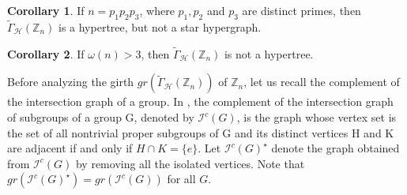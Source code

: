 \documentclass[11pt,a4paper]{article}
\theoremstyle{definition}
\newtheorem{corollary}{Corollary}[theorem]
\theoremstyle{remark}
\begin{document}
	\begin{corollary}
		If $n=p_1p_2p_3$, where $p_1,p_2$ and $p_3$ are distinct primes, then $\tilde{\Gamma}_\mathcal{H}(\mathbb{Z}_n)$ is a hypertree, but not a star hypergraph.
	\end{corollary}
	\begin{corollary}
		If $\omega(n) > 3$, then $\tilde{\Gamma}_\mathcal{H}(\mathbb{Z}_n)$ is not a hypertree. 
	\end{corollary}
	\noindent Before analyzing the girth $gr(\tilde{\Gamma}_\mathcal{H}(\mathbb{Z}_n))$ of $\mathbb{Z}_n$, let us recall the complement of the intersection graph of a group. In \cite{devicomplement}, the complement of the intersection graph of subgroups of a group G, denoted by  $\mathscr{I}^c(G)$, is the graph whose vertex set is the set of all nontrivial proper subgroups of
	G and its distinct vertices H and K are adjacent if and only if $H \cap K =\{e\}$. Let  $\mathscr{I}^c(G)^{\star}$ denote the graph obtained from  $\mathscr{I}^c(G)$ by removing all the isolated vertices. Note that $gr(\mathscr{I}^c(G)^{\star})=gr(\mathscr{I}^c(G))$ for all $G$.
\end{document}

